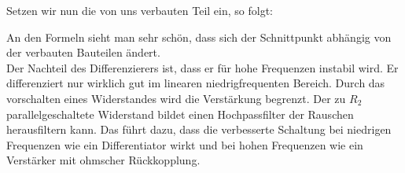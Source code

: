 Setzen wir nun die von uns verbauten Teil ein, so folgt:

\begin{center}
\end{center}

An den Formeln sieht man sehr schön, dass sich der Schnittpunkt abhängig von der verbauten 
Bauteilen ändert.\\
Der Nachteil des Differenzierers ist, dass er für hohe Frequenzen instabil wird. Er differenziert nur 
wirklich gut im linearen niedrigfrequenten Bereich. Durch das vorschalten eines Widerstandes wird die Verstärkung begrenzt. 
Der zu $R_2$ parallelgeschaltete Widerstand bildet einen Hochpassfilter der Rauschen herausfiltern kann. 
Das führt dazu, dass die verbesserte Schaltung bei niedrigen Frequenzen wie ein Differentiator wirkt und bei hohen 
Frequenzen wie ein Verstärker mit ohmscher Rückkopplung.\footnotemark
{}
